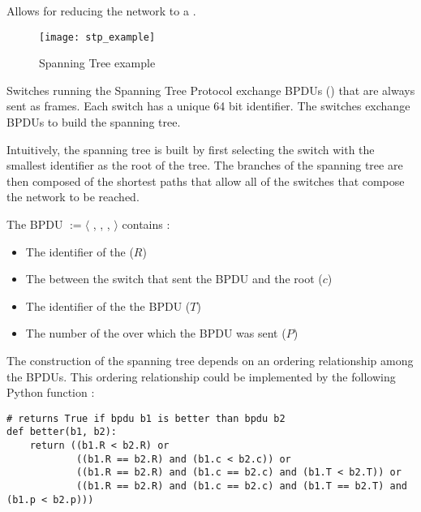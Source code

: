 Allows for reducing the network to a .

\begin{minipage}{0.38\textwidth}
	\begin{figure}[H]
		\centering
		\texttt{[image: stp\_example]}
		\caption{Spanning Tree example}
	\end{figure}
\end{minipage}
\begin{minipage}{0.6\textwidth}
	Switches running the Spanning Tree Protocol exchange BPDUs () that are always sent as frames. Each switch has a unique 64 bit identifier. The switches exchange BPDUs to build the spanning tree.
	
	Intuitively, the spanning tree is built by first selecting the switch with the smallest identifier as the root of the tree. The branches of the spanning tree are then composed of the shortest paths that allow all of the switches that compose the network to be reached.
\end{minipage}

The BPDU $:= \langle$ , , ,  $\rangle$ contains :
\begin{itemize}
\item The identifier of the  ($R$)
\item The  between the switch that sent the BPDU and the root ($c$)
\item The identifier of the  the BPDU ($T$)
\item The number of the  over which the BPDU was sent ($P$)
\end{itemize}

The construction of the spanning tree depends on an ordering relationship among the BPDUs. This ordering relationship could be implemented by the following Python function :

\begin{verbatim}
# returns True if bpdu b1 is better than bpdu b2
def better(b1, b2):
    return ((b1.R < b2.R) or
            ((b1.R == b2.R) and (b1.c < b2.c)) or
            ((b1.R == b2.R) and (b1.c == b2.c) and (b1.T < b2.T)) or
            ((b1.R == b2.R) and (b1.c == b2.c) and (b1.T == b2.T) and (b1.p < b2.p)))
\end{verbatim}


